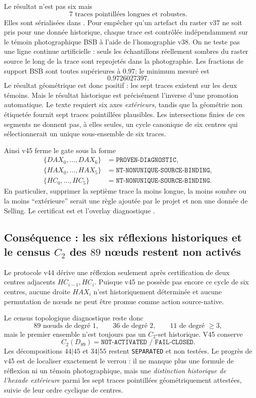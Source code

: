 \documentclass[11pt,a4paper]{article}
\newcommand{\certSeparated}{\texttt{SEPARATED}}
\begin{document}
Le résultat n'est pas six mais
\[
 \boxed{7\text{ traces pointillées longues et robustes}.}
\]
Elles sont sérialisées dans . Pour empêcher qu'un artefact du raster v37 ne soit pris pour une donnée historique, chaque trace est contrôlée indépendamment sur le témoin photographique BSB à l'aide de l'homographie v38. On ne teste pas une ligne continue artificielle : seuls les échantillons réellement sombres du raster source le long de la trace sont reprojetés dans la photographie. Les fractions de support BSB sont toutes supérieures à $0.97$; le minimum mesuré est
\[
 \boxed{0.9726027397.}
\]
Le résultat géométrique est donc positif : les sept traces existent sur les deux témoins. Mais le résultat historique est précisément l'inverse d'une promotion automatique. Le texte requiert six axes \emph{extérieurs}, tandis que la géométrie non étiquetée fournit sept traces pointillées plausibles. Les intersections finies de ces segments ne donnent pas, à elles seules, un cycle canonique de six centres qui sélectionnerait un unique sous-ensemble de six traces.

Ainsi v45 ferme le gate sous la forme
\[
 \boxed{
 \begin{aligned}
 \{DAX_0,\ldots,DAX_6\}&=\texttt{PROVEN-DIAGNOSTIC},\\
 \{HAX_0,\ldots,HAX_5\}&=\texttt{NT-NONUNIQUE-SOURCE-BINDING},\\
 \{HC_0,\ldots,HC_5\}&=\texttt{NT-NONUNIQUE-SOURCE-BINDING}.
 \end{aligned}}
\]
En particulier, supprimer la septième trace la moins longue, la moins sombre ou la moins ``extérieure'' serait une règle ajoutée par le projet et non une donnée de Selling. Le certificat est  et l'overlay diagnostique .

\subsection{Conséquence : les six réflexions historiques et le census $C_2$ des $89$ nœuds restent non activés}

Le protocole v44 dérive une réflexion seulement après certification de deux centres adjacents $HC_{i-1},HC_i$. Puisque v45 ne possède pas encore ce cycle de six centres, aucune droite $HAX_i$ n'est historiquement déterminée et aucune permutation de nœuds ne peut être promue comme action source-native.

Le census topologique diagnostique reste donc
\[
 89\text{ nœuds de degré }1,
 \qquad36\text{ de degré }2,
 \qquad11\text{ de degré }\ge3,
\]
mais le premier ensemble n'est toujours pas un $C_2$-set historique. V45 conserve
\[
 \boxed{C_2(D_{89})=\texttt{NOT-ACTIVATED / FAIL-CLOSED}.}
\]
Les décompositions $44|45$ et $34|55$ restent \certSeparated{} et non testées. Le progrès de v45 est de localiser exactement le verrou : il ne manque plus une formule de réflexion ni un témoin photographique, mais une \emph{distinction historique de l'hexade extérieure} parmi les sept traces pointillées géométriquement attestées, suivie de leur ordre cyclique de centres.
\end{document}
